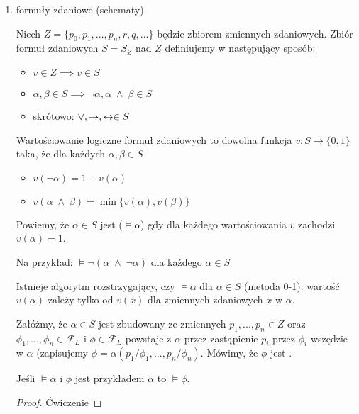 \begin{enumerate}[label=\alph*)]
  \item formuły zdaniowe (schematy)

    Niech $Z=\{p_0, p_1,...,p_n, r, q,...\}$ będzie zbiorem zmiennych zdaniowych. Zbiór formuł zdaniowych $S=S_Z$ nad $Z$ definiujemy w następujący sposób:
    \begin{itemize}
      \item $v\in Z\implies v\in S$
      \item $\alpha, \beta\in S\implies \neg\alpha, \alpha\;\land\;\beta\in S$
      \item skrótowo: $\lor, \to, \leftrightarrow\in S$
    \end{itemize}

    Wartościowanie logiczne formuł zdaniowych to dowolna funkcja $v:S\to \{0,1\}$ taka, że dla każdych $\alpha,\beta\in S$ 
    \begin{itemize}
      \item $v(\neg\alpha)=1-v(\alpha)$
      \item $v(\alpha\;\land\;\beta)=\min\{v(\alpha), v(\beta)\}$
    \end{itemize}
  
    Powiemy, że $\alpha\in S$ jest  ($\models\alpha$) gdy dla każdego wartościowania $v$ zachodzi $v(\alpha)=1$.

    Na przykład: $\models\neg(\alpha\;\land\;\neg\alpha)$ dla każdego $\alpha\in S$

    Istnieje algorytm rozstrzygający, czy $\models \alpha$ dla $\alpha\in S$ (metoda 0-1): wartość $v(\alpha)$ zależy tylko od $v(x)$ dla zmiennych zdaniowych $x$ w $\alpha$.

    \begin{definition}{}{}
      Załóżmy, że $\alpha\in S$ jest zbudowany ze zmiennych $p_1,..., p_n\in Z$ oraz $\phi_1,..., \phi_n\in\mathcal{F}_L$ i $\phi\in\mathcal{F}_L$ powstaje z $\alpha$ przez zastąpienie $p_i$ przez $\phi_i$ wszędzie w $\alpha$ (zapisujemy $\phi=\alpha(p_1/\phi_1,...,p_n/\phi_n)$. Mówimy, że $\phi$ jest . 
    \end{definition}

    \begin{theorem}{}{}
      Jeśli $\models\alpha$ i $\phi$ jest przykładem $\alpha$ to $\models\phi$.
    \end{theorem}
    \begin{proof}
      Ćwiczenie
    \end{proof}
\end{enumerate}

